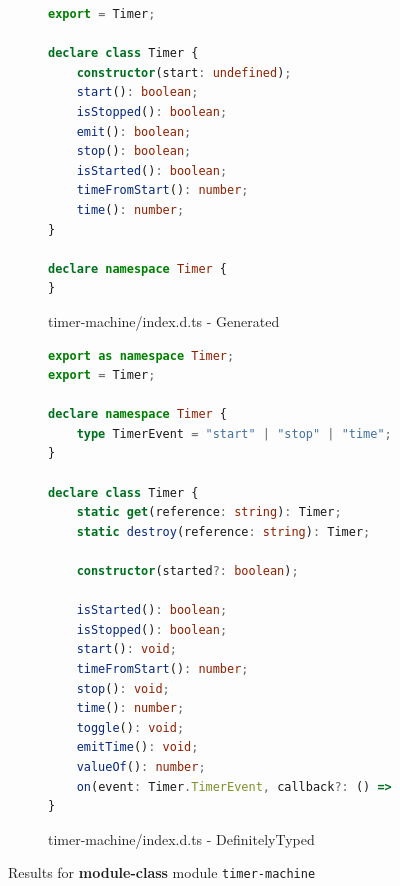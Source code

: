 \documentclass[a4paper,english,cleveref, autoref]{lipics-v2019}
\begin{document}
\begin{figure}[tp]
    \centering
    \begin{subfigure}{0.48\linewidth}
      \begin{lstlisting}[language=TypeScript]
export = Timer;

declare class Timer {
    constructor(start: undefined);
    start(): boolean;
    isStopped(): boolean;
    emit(): boolean;
    stop(): boolean;
    isStarted(): boolean;
    timeFromStart(): number;
    time(): number;
}

declare namespace Timer {
}
      \end{lstlisting}
      \caption{timer-machine/index.d.ts - Generated}
    \end{subfigure}
    \hfill
    \begin{subfigure}{0.48\linewidth}
      \begin{lstlisting}[language=TypeScript]
export as namespace Timer;
export = Timer;

declare namespace Timer {
    type TimerEvent = "start" | "stop" | "time";
}

declare class Timer {
    static get(reference: string): Timer;
    static destroy(reference: string): Timer;

    constructor(started?: boolean);

    isStarted(): boolean;
    isStopped(): boolean;
    start(): void;
    timeFromStart(): number;
    stop(): void;
    time(): number;
    toggle(): void;
    emitTime(): void;
    valueOf(): number;
    on(event: Timer.TimerEvent, callback?: () => void): void;
}
      \end{lstlisting}
      \caption{timer-machine/index.d.ts - DefinitelyTyped}
    \end{subfigure}

    \caption{Results for \textbf{module-class} module \texttt{timer-machine}}
    \label{fig:experiments-results-module-class-timer-machine}
\end{figure}
\end{document}

